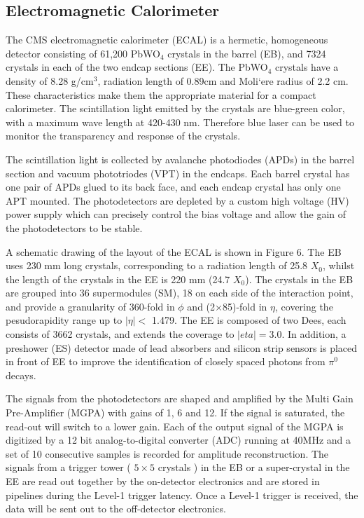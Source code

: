 \documentclass[thesis.tex]{subfiles}
\begin{document}
\subsection{Electromagnetic Calorimeter}
The CMS electromagnetic calorimeter (ECAL) is a hermetic, homogeneous detector consisting of 61,200 PbWO$_4$ crystals in the barrel (EB), and 7324 crystals in each of the two endcap sections (EE). 
The PbWO$_4$ crystals have a density of 8.28 g/cm$^3$, radiation length of 0.89cm and Moli`ere radius of 2.2 cm. 
These characteristics make them the appropriate material for a compact calorimeter. 
The scintillation light emitted by the crystals are blue-green color, with a maximum wave length at 420-430 nm. 
Therefore blue laser can be used to monitor the transparency and response of the crystals. 

The scintillation light is collected by avalanche photodiodes (APDs) in the barrel section and vacuum phototriodes (VPT) in the endcaps. 
Each barrel crystal has one pair of APDs glued to its back face, and each endcap crystal has only one APT mounted. 
The photodetectors are depleted by a custom high voltage (HV) power supply which can precisely control the bias voltage and allow the gain of the photodetectors to be stable. 

A schematic drawing of the layout of the ECAL is shown in Figure 6. 
The EB uses 230 mm long crystals, corresponding to a radiation length of 25.8 $X_0$, whilst the length of the crystals in the EE is 220 mm (24.7 $X_0$). 
The crystals in the EB are grouped into 36 supermodules (SM), 18 on each side of the interaction point, and provide a granularity of 360-fold in $\phi$ and (2$\times$85)-fold in $\eta$, covering the pesudorapidity range up to $|\eta| <$ 1.479. 
The EE is composed of two Dees, each consists of 3662 crystals, and extends the coverage to $|eta| = $3.0. 
In addition, a preshower (ES) detector made of lead absorbers and silicon strip sensors is placed in front of EE to improve the identification of closely spaced photons from $\pi^0$ decays. 

The signals from the photodetectors are shaped and amplified by the Multi Gain Pre-Amplifier (MGPA) with gains of 1, 6 and 12. 
If the signal is saturated, the read-out will switch to a lower gain. 
Each of the output signal of the MGPA is digitized by a 12 bit analog-to-digital converter (ADC) running at 40MHz and a set of 10 consecutive samples is recorded for amplitude reconstruction.
The signals from a trigger tower ( $5\times5$ crystals ) in the EB or a super-crystal in the EE are read out together by the on-detector electronics and are stored in pipelines during the Level-1 trigger latency. 
Once a Level-1 trigger is received, the data will be sent out to the off-detector electronics. 
\end{document}
